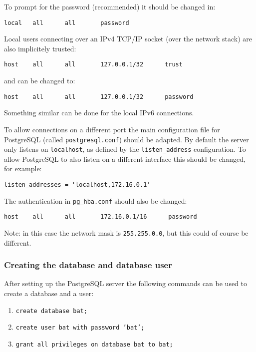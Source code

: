 \documentclass[10pt,a4paper]{article}
\begin{document}
To prompt for the password (recommended) it should be changed in:

\begin{verbatim}
local   all      all       password
\end{verbatim}

Local users connecting over an IPv4 TCP/IP socket (over the network stack) are
also implicitely trusted:

\begin{verbatim}
host    all      all       127.0.0.1/32      trust
\end{verbatim}

and can be changed to:

\begin{verbatim}
host    all      all       127.0.0.1/32      password
\end{verbatim}

Something similar can be done for the local IPv6 connections.

To allow connections on a different port the main configuration file for
PostgreSQL (called \texttt{postgresql.conf}) should be adapted. By default the
server only listens on \texttt{localhost}, as defined by the
\texttt{listen\_address} configuration. To allow PostgreSQL to also listen on a
different interface this should be changed, for example:

\begin{verbatim}
listen_addresses = 'localhost,172.16.0.1'
\end{verbatim}

The authentication in \texttt{pg\_hba.conf} should also be changed:

\begin{verbatim}
host    all      all       172.16.0.1/16      password
\end{verbatim}

Note: in this case the network mask is \texttt{255.255.0.0}, but this could
of course be different.

\subsubsection{Creating the database and database user}

After setting up the PostgreSQL server the following commands can be used to
create a database and a user:

\begin{enumerate}
\item \texttt{create database bat;}
\item \texttt{create user bat with password 'bat';}
\item \texttt{grant all privileges on database bat to bat;}
\end{enumerate}
\end{document}
